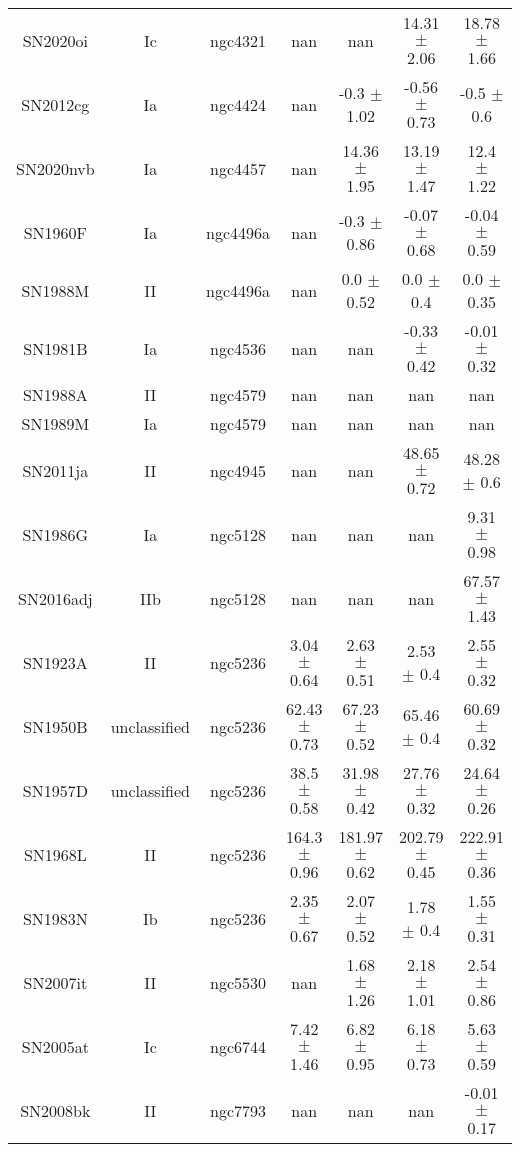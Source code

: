 \begin{table}
\begin{tabular}{ccccccc}
SN2020oi & Ic & ngc4321 & nan & nan & 14.31 $\pm$ 2.06 & 18.78 $\pm$ 1.66 \\
SN2012cg & Ia & ngc4424 & nan & -0.3 $\pm$ 1.02 & -0.56 $\pm$ 0.73 & -0.5 $\pm$ 0.6 \\
SN2020nvb & Ia & ngc4457 & nan & 14.36 $\pm$ 1.95 & 13.19 $\pm$ 1.47 & 12.4 $\pm$ 1.22 \\
SN1960F & Ia & ngc4496a & nan & -0.3 $\pm$ 0.86 & -0.07 $\pm$ 0.68 & -0.04 $\pm$ 0.59 \\
SN1988M & II & ngc4496a & nan & 0.0 $\pm$ 0.52 & 0.0 $\pm$ 0.4 & 0.0 $\pm$ 0.35 \\
SN1981B & Ia & ngc4536 & nan & nan & -0.33 $\pm$ 0.42 & -0.01 $\pm$ 0.32 \\
SN1988A & II & ngc4579 & nan & nan & nan & nan \\
SN1989M & Ia & ngc4579 & nan & nan & nan & nan \\
SN2011ja & II & ngc4945 & nan & nan & 48.65 $\pm$ 0.72 & 48.28 $\pm$ 0.6 \\
SN1986G & Ia & ngc5128 & nan & nan & nan & 9.31 $\pm$ 0.98 \\
SN2016adj & IIb & ngc5128 & nan & nan & nan & 67.57 $\pm$ 1.43 \\
SN1923A & II & ngc5236 & 3.04 $\pm$ 0.64 & 2.63 $\pm$ 0.51 & 2.53 $\pm$ 0.4 & 2.55 $\pm$ 0.32 \\
SN1950B & unclassified & ngc5236 & 62.43 $\pm$ 0.73 & 67.23 $\pm$ 0.52 & 65.46 $\pm$ 0.4 & 60.69 $\pm$ 0.32 \\
SN1957D & unclassified & ngc5236 & 38.5 $\pm$ 0.58 & 31.98 $\pm$ 0.42 & 27.76 $\pm$ 0.32 & 24.64 $\pm$ 0.26 \\
SN1968L & II & ngc5236 & 164.3 $\pm$ 0.96 & 181.97 $\pm$ 0.62 & 202.79 $\pm$ 0.45 & 222.91 $\pm$ 0.36 \\
SN1983N & Ib & ngc5236 & 2.35 $\pm$ 0.67 & 2.07 $\pm$ 0.52 & 1.78 $\pm$ 0.4 & 1.55 $\pm$ 0.31 \\
SN2007it & II & ngc5530 & nan & 1.68 $\pm$ 1.26 & 2.18 $\pm$ 1.01 & 2.54 $\pm$ 0.86 \\
SN2005at & Ic & ngc6744 & 7.42 $\pm$ 1.46 & 6.82 $\pm$ 0.95 & 6.18 $\pm$ 0.73 & 5.63 $\pm$ 0.59 \\
SN2008bk & II & ngc7793 & nan & nan & nan & -0.01 $\pm$ 0.17 \\
\end{tabular}
\end{table}
